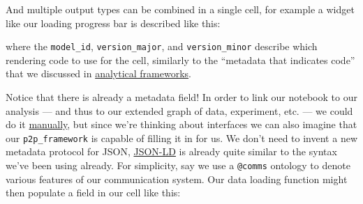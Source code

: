 \begin{Shaded}
\begin{Highlighting}[]
\FunctionTok{\{}
  \FunctionTok{:} \FunctionTok{,}
  \FunctionTok{:} \FunctionTok{,}
  \FunctionTok{:} \OtherTok{[}
    \OtherTok{,}
  \OtherTok{]}
\FunctionTok{\}}
\end{Highlighting}
\end{Shaded}

And multiple output types can be combined in a single cell, for example
a widget like our loading progress bar is described like this:

\begin{Shaded}
\begin{Highlighting}[]
\FunctionTok{\{}
  \FunctionTok{:} \FunctionTok{\{}
    \FunctionTok{:} \FunctionTok{\{}
      \FunctionTok{:} \FunctionTok{,}
      \FunctionTok{:} \FunctionTok{,}
      \FunctionTok{:} 
    \FunctionTok{\},}
    \FunctionTok{:} \OtherTok{[}
    \OtherTok{]}
    \FunctionTok{\},}
    \FunctionTok{:} \FunctionTok{\{\},}
  \FunctionTok{:} 
\FunctionTok{\}}
\end{Highlighting}
\end{Shaded}

where the \texttt{model\_id}, \texttt{version\_major}, and
\texttt{version\_minor} describe which rendering code to use for the
cell, similarly to the ``metadata that indicates code'' that we
discussed in \protect\hyperlink{analytical-frameworks}{analytical
frameworks}.

Notice that there is already a metadata field! In order to link our
notebook to our analysis --- and thus to our extended graph of data,
experiment, etc. --- we could do it
\href{https://jupyterbook.org/en/stable/content/metadata.html}{manually},
but since we're thinking about interfaces we can also imagine that our
\texttt{p2p\_framework} is capable of filling it in for us. We don't
need to invent a new metadata protocol for JSON,
\href{https://json-ld.org/}{JSON-LD} is already quite similar to the
syntax we've been using already. For simplicity, say we use a
\texttt{@comms} ontology to denote various features of our communication
system. Our data loading function might then populate a field in our
cell like this:

